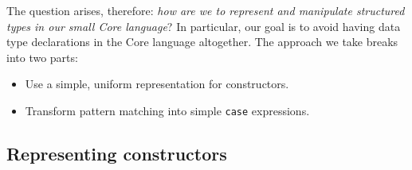 The question arises, therefore: {\em how are we to represent and manipulate
structured types in our small Core language\/}?
In particular, our goal is to avoid having data type declarations in the
Core language altogether.
The approach we take breaks into two parts:
\begin{itemize}
\item
Use a simple, uniform representation for constructors.
\item
Transform pattern matching into simple \mbox{\tt case} expressions.
\end{itemize}

\subsection{Representing constructors}
\label{sect:lang:constructors}

